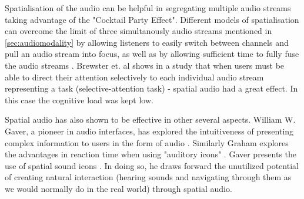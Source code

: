 Spatialisation of the audio can be helpful in segregating multiple audio streams taking advantage of the "Cocktail Party Effect". Different models of spatialisation can overcome the limit of three simultanously audio streams mentioned in \ref{sec:audiomodality} by allowing listeners to easily switch between channels and pull an audio stream into focus, as well as by allowing sufficient time to fully fuse the audio streams \cite{bronkhorst_cocktail_2000}. Brewster et. al \cite{vazquez-alvarez_eyes-free_2011} shows in a study that when users must be able to direct their attention selectively to each individual audio stream representing a task (selective-attention task) - spatial audio had a great effect. In this case the cognitive load was kept low.



Spatial audio has also shown to be effective in other several aspects. William W. Gaver, a pioneer in audio interfaces, has explored the intuitiveness of presenting complex information to users in the form of audio \cite{gaver_sonicfinder:_1989}. Similarly Graham explores the advantages in reaction time when using "auditory icons" \cite{graham_use_1999}. Gaver presents the use of spatial sound icons \cite{gaver_auditory_1986}. In doing so, he draws forward the unutilized potential of creating natural interaction (hearing sounds and navigating through them as we would normally do in the real world) through spatial audio.


